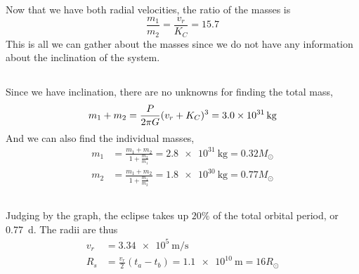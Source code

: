 \documentclass{article}
\begin{document}
\subsection{}

Now that we have both radial velocities, the ratio of the masses is
\begin{equation}
    \frac{m_1}{m_2} = \frac{v_r}{K_C} = \num{15.7}
\end{equation}
This is all we can gather about the masses since we do not have any information about the inclination of the system.

\subsection{}

Since we have inclination, there are no unknowns for finding the total mass,
\begin{equation}
    m_1 + m_2 = \frac{P}{2 \pi G} (v_r + K_C)^3 = \SI{3.0e+31}{\kilogram} \\
\end{equation}
And we can also find the individual masses,
\begin{align}
    m_1 &= \frac{m_1 + m_2}{1 + \frac{m_2}{m_1}} = \SI{2.8e+31}{\kilogram} = 0.32 M_\odot \\
    m_2 &= \frac{m_1 + m_2}{1 + \frac{m_1}{m_2}} = \SI{1.8e+30}{\kilogram} = 0.77 M_\odot
\end{align}

\subsection{}

Judging by the graph, the eclipse takes up \(20\%\) of the total orbital period, or \SI{0.77}{\day}.
The radii are thus
\begin{align}
    v_r &= \SI{3.34e+5}{\meter\per\second} \\
    R_s &= \frac{v_r}{2} (t_a - t_b) = \SI{1.1e+10}{\meter} = \num{16} R_\odot
\end{align}
\end{document}
